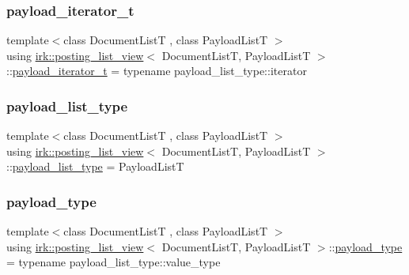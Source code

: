\subsubsection{\texorpdfstring{payload\+\_\+iterator\+\_\+t}{payload\_iterator\_t}}
{\footnotesize\ttfamily template$<$class Document\+ListT , class Payload\+ListT $>$ \\
using \mbox{\hyperlink{classirk_1_1posting__list__view}{irk\+::posting\+\_\+list\+\_\+view}}$<$ Document\+ListT, Payload\+ListT $>$\+::\mbox{\hyperlink{classirk_1_1posting__list__view_a5a153169348a164ea2cb1a18dc76e279}{payload\+\_\+iterator\+\_\+t}} =  typename payload\+\_\+list\+\_\+type\+::iterator}

\mbox{\label{classirk_1_1posting__list__view_aabf1afcb3a994971f30879354301e1fe}} 
\subsubsection{\texorpdfstring{payload\+\_\+list\+\_\+type}{payload\_list\_type}}
{\footnotesize\ttfamily template$<$class Document\+ListT , class Payload\+ListT $>$ \\
using \mbox{\hyperlink{classirk_1_1posting__list__view}{irk\+::posting\+\_\+list\+\_\+view}}$<$ Document\+ListT, Payload\+ListT $>$\+::\mbox{\hyperlink{classirk_1_1posting__list__view_aabf1afcb3a994971f30879354301e1fe}{payload\+\_\+list\+\_\+type}} =  Payload\+ListT}

\mbox{\label{classirk_1_1posting__list__view_a1c394061061a8eeeab98cb228f6cdde9}} 
\subsubsection{\texorpdfstring{payload\+\_\+type}{payload\_type}}
{\footnotesize\ttfamily template$<$class Document\+ListT , class Payload\+ListT $>$ \\
using \mbox{\hyperlink{classirk_1_1posting__list__view}{irk\+::posting\+\_\+list\+\_\+view}}$<$ Document\+ListT, Payload\+ListT $>$\+::\mbox{\hyperlink{classirk_1_1posting__list__view_a1c394061061a8eeeab98cb228f6cdde9}{payload\+\_\+type}} =  typename payload\+\_\+list\+\_\+type\+::value\+\_\+type}



